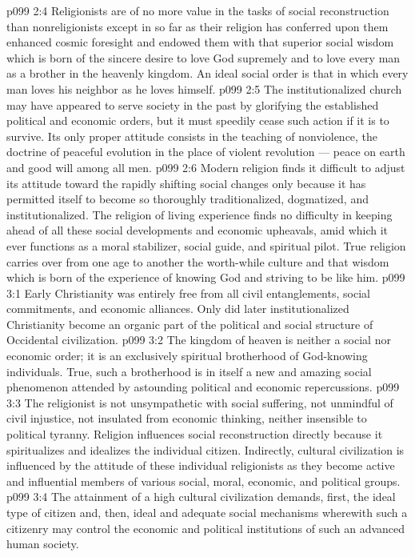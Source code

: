 \vs p099 2:4 Religionists are of no more value in the tasks of social reconstruction than nonreligionists except in so far as their religion has conferred upon them enhanced cosmic foresight and endowed them with that superior social wisdom which is born of the sincere desire to love God supremely and to love every man as a brother in the heavenly kingdom. An ideal social order is that in which every man loves his neighbor as he loves himself.
\vs p099 2:5 \pc The institutionalized church may have appeared to serve society in the past by glorifying the established political and economic orders, but it must speedily cease such action if it is to survive. Its only proper attitude consists in the teaching of nonviolence, the doctrine of peaceful evolution in the place of violent revolution --- peace on earth and good will among all men.
\vs p099 2:6 Modern religion finds it difficult to adjust its attitude toward the rapidly shifting social changes only because it has permitted itself to become so thoroughly traditionalized, dogmatized, and institutionalized. The religion of living experience finds no difficulty in keeping ahead of all these social developments and economic upheavals, amid which it ever functions as a moral stabilizer, social guide, and spiritual pilot. True religion carries over from one age to another the worth\hyp{}while culture and that wisdom which is born of the experience of knowing God and striving to be like him.
\vs p099 3:1 Early Christianity was entirely free from all civil entanglements, social commitments, and economic alliances. Only did later institutionalized Christianity become an organic part of the political and social structure of Occidental civilization.
\vs p099 3:2 \pc The kingdom of heaven is neither a social nor economic order; it is an exclusively spiritual brotherhood of God\hyp{}knowing individuals. True, such a brotherhood is in itself a new and amazing social phenomenon attended by astounding political and economic repercussions.
\vs p099 3:3 The religionist is not unsympathetic with social suffering, not unmindful of civil injustice, not insulated from economic thinking, neither insensible to political tyranny. Religion influences social reconstruction directly because it spiritualizes and idealizes the individual citizen. Indirectly, cultural civilization is influenced by the attitude of these individual religionists as they become active and influential members of various social, moral, economic, and political groups.
\vs p099 3:4 \pc The attainment of a high cultural civilization demands, first, the ideal type of citizen and, then, ideal and adequate social mechanisms wherewith such a citizenry may control the economic and political institutions of such an advanced human society.

